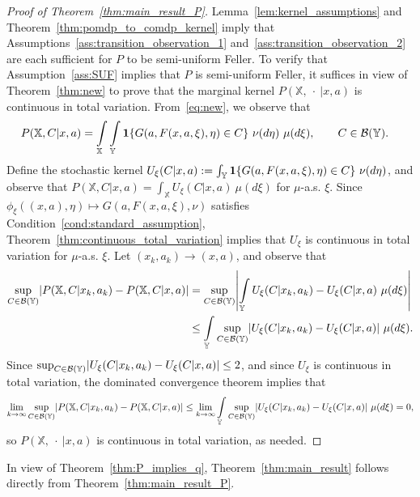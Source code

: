 \documentclass[11pt,onecolumn]{IEEEtran}  %
\newcommand{\Xb}{\mathbb{X}}
\newcommand{\Yb}{\mathbb{Y}}
\newcommand{\Bc}{\mathcal{B}}
\newcommand{\one}[1]{\mathbf{1}\set{#1}}
\newcommand{\defeq}{:=}%
\DeclarePairedDelimiter{\set}{\{}{\}}
\DeclarePairedDelimiter{\abs}{|}{|}
\theoremstyle{definition}
\begin{document}
\begin{proof}[{Proof of Theorem~\ref{thm:main_result_P}}]
    Lemma~\ref{lem:kernel_assumptions} and Theorem~\ref{thm:pomdp_to_comdp_kernel} imply that Assumptions~\ref{ass:transition_observation_1} and~\ref{ass:transition_observation_2} are each sufficient for $P$ to be semi-uniform Feller.  To verify that Assumption~\ref{ass:SUF} implies that $P$ is semi-uniform Feller, it suffices in view of Theorem~\ref{thm:new} to prove that the marginal kernel $P(\Xb,\:\cdot\:|x,a)$ is continuous in total variation. From~\eqref{eq:new}, we observe that
    \begin{align*}
        P(\Xb, C|x,a) &= \int\limits_{\Xb}\int\limits_{\Yb} \one{G(a,F(x,a,\xi), \eta) \in C} \ \nu(d\eta) \ \mu(d\xi), \qquad C \in \Bc(\Yb).
    \end{align*}
    Define the stochastic kernel $U_\xi(C|x,a) \defeq \int_{\Yb} \one{G(a,F(x,a,\xi),\eta) \in C} \ \nu(d\eta)$, and observe that $P(\Xb,C|x,a) = \int_{\Xb} U_{\xi}(C|x,a) \ \mu(d\xi)$ for $\mu$-a.s. $\xi$. Since $\phi_\xi((x,a), \eta) \mapsto G(a,F(x,a,\xi),\nu)$ satisfies Condition~\ref{cond:standard_assumption}, Theorem~\ref{thm:continuous_total_variation} implies that $U_\xi$ is continuous in total variation for $\mu$-a.s. $\xi$. Let $(x_k, a_k) \to (x,a)$, and observe that
    \begin{align*}
        \sup_{C \in \Bc(\Yb)} \abs*{P(\Xb,C|x_k,a_k) - P(\Xb,C|x,a)}
        &= \sup_{C \in \Bc(\Yb)} \abs*{
            \int\limits_{\Yb} U_{\xi}(C|x_k,a_k) - U_{\xi}(C|x,a) \ \mu(d\xi)
        } \\
        &\leq \int\limits_{\Yb} \sup_{C \in \Bc(\Yb)} \abs{U_\xi(C|x_k,a_k) - U_\xi(C|x,a)} \ \mu(d\xi).
    \end{align*}
    Since $\sup_{C \in \Bc(\Yb)} \abs{U_\xi(C|x_k,a_k) - U_\xi(C|x,a)} \leq 2$, and since $U_\xi$ is continuous in total variation, the dominated convergence theorem implies that
    \begin{equation*}
        \lim_{k \to \infty} \sup_{C \in \Bc(\Yb)} \abs*{P(\Xb,C|x_k,a_k) - P(\Xb,C|x,a)} \leq
        \lim_{k \to \infty} \int\limits_{\Yb} \sup_{C \in \Bc(\Yb)} \abs{U_\xi(C|x_k,a_k) - U_\xi(C|x,a)} \ \mu(d\xi) = 0,
    \end{equation*}
    so $P(\Xb,\:\cdot\:|x,a)$ is continuous in total variation, as needed.
\end{proof}

In view of Theorem~\ref{thm:P_implies_q}, Theorem~\ref{thm:main_result} follows directly from Theorem~\ref{thm:main_result_P}.
\end{document}
